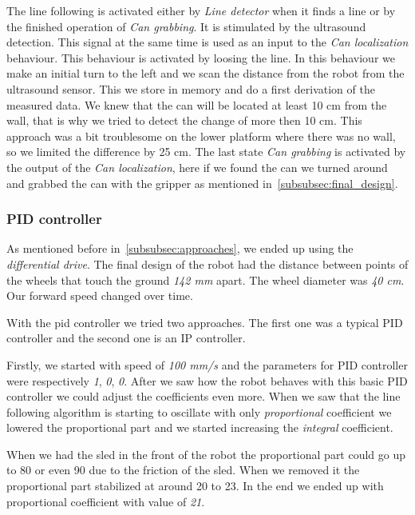 \documentclass{article}
\begin{document}
The line following is activated either by \textit{Line detector} when it finds a line or by the finished operation
of \textit{Can grabbing}. It is stimulated by the ultrasound detection. This signal at the same time is used as an
input to the \textit{Can localization} behaviour. This behaviour is activated by loosing the line. In this behaviour
we make an initial turn to the left and we scan the distance from the robot from the ultrasound sensor. This we store
in memory and do a first derivation of the measured data. We knew that the can will be located at least 10 cm from the
wall, that is why we tried to detect the change of more then 10 cm. This approach was a bit troublesome on the lower
platform where there was no wall, so we limited the difference by 25 cm. The last state \textit{Can grabbing} is
activated by the output of the \textit{Can localization}, here if we found the can we turned around and grabbed the can
with the gripper as mentioned in~\ref{subsubsec:final_design}.

\subsubsection{PID controller}
\label{subsubsec:pid}

As mentioned before in~\ref{subsubsec:approaches}, we ended up using the \textit{differential drive}. The final design
of the robot had the distance between points of the wheels that touch the ground \textit{142 mm} apart. The wheel
diameter was \textit{40 cm}. Our forward speed changed over time.

With the pid controller we tried two approaches. The first one was a typical PID controller and the second one is
an IP controller.

Firstly, we started with speed of \textit{100 mm/s} and the parameters for PID controller were respectively \textit{1},
\textit{0}, \textit{0}. After we saw how the robot behaves with this basic PID controller we could adjust the coefficients
even more. When we saw that the line following algorithm is starting to oscillate with only \textit{proportional}
coefficient we lowered the proportional part and we started increasing the \textit{integral} coefficient.

When we had the sled in the front of the robot the proportional part could go up to 80 or even 90 due to the friction of
the sled. When we removed it the proportional part stabilized at around 20 to 23. In the end we ended up with
proportional coefficient with value of \textit{21}.
\end{document}
